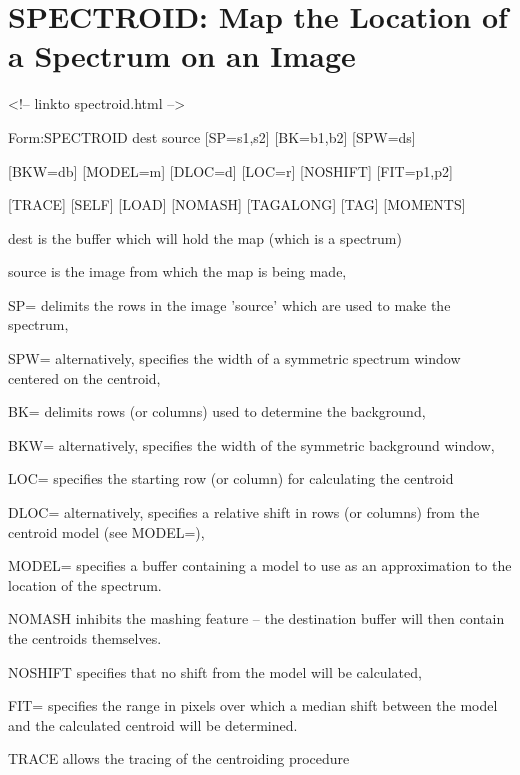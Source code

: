 \section{SPECTROID: Map the Location of a Spectrum on an Image}
\begin{rawhtml}
<!-- linkto spectroid.html -->
\end{rawhtml}
\begin{command}
  \item[Form:SPECTROID dest source {[SP=s1,s2]} {[BK=b1,b2]} 
       {[SPW=ds]}\hfill]{}
  \item{{[BKW=db]} {[MODEL=m]} {[DLOC=d]} {[LOC=r]} {[NOSHIFT]} {[FIT=p1,p2]}}
  \item{{[TRACE]} {[SELF]} {[LOAD]} {[NOMASH]} {[TAGALONG]} {[TAG]} 
       {[MOMENTS]}}
  \item[dest]{is the buffer which will hold the map (which is a spectrum)}
  \item[source]{is the image from which the map is being made,}
  \item[SP=]{delimits the rows in the image 'source' which
       are used to make the spectrum,}
  \item[SPW=]{alternatively, specifies the width of a
       symmetric spectrum window centered on the centroid,}
  \item[BK=]{delimits rows (or columns) used to determine the background,}
  \item[BKW=]{alternatively, specifies the width of the
       symmetric background window,}
  \item[LOC=]{specifies the starting row (or column) for calculating
       the centroid}
  \item[DLOC=]{alternatively, specifies a relative shift in
       rows (or columns) from the centroid model (see MODEL=),}
  \item[MODEL=]{specifies a buffer containing a model to
       use as an approximation to the location of the spectrum.}
  \item[NOMASH]{inhibits the mashing feature -- the destination
       buffer will then contain the centroids themselves.}
  \item[NOSHIFT]{specifies that no shift from the model will be calculated,}
  \item[FIT=]{specifies the range in pixels over which a
       median shift between the model and the calculated centroid will 
       be determined.}
  \item[TRACE]{allows the tracing of the centroiding procedure
}
\end{command}

